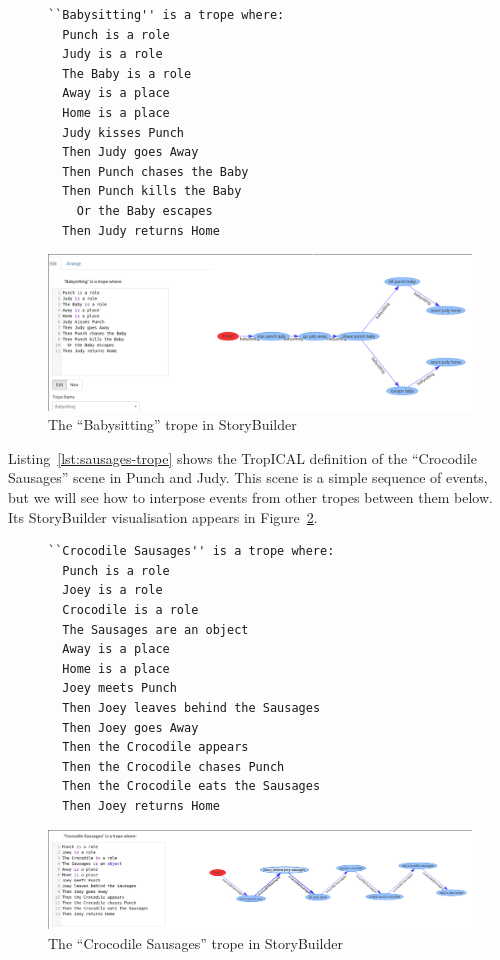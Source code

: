 \documentclass[11pt]{report}
\begin{document}
\begin{figure}[!t]
\begin{lstlisting}[label={lst:babysitting-trope},caption={The ``Babysitting'' trope}]
``Babysitting'' is a trope where:
  Punch is a role
  Judy is a role
  The Baby is a role
  Away is a place
  Home is a place
  Judy kisses Punch
  Then Judy goes Away
  Then Punch chases the Baby
  Then Punch kills the Baby
    Or the Baby escapes
  Then Judy returns Home
\end{lstlisting}

\smallskip
\centerline{\includegraphics[width=\textwidth]{babysitting-trope.png}}
\caption{The ``Babysitting'' trope in StoryBuilder}\label{fig:babysitting-trope}
\end{figure}

Listing~\ref{lst:sausages-trope} shows the TropICAL definition of the
``Crocodile Sausages'' scene in Punch and Judy. This scene is a simple sequence
of events, but we will see how to interpose events from other tropes between
them below. Its StoryBuilder visualisation appears in Figure~\ref{fig:crocodile-sausages}.

\begin{figure}[!t]
\begin{lstlisting}[label={lst:sausages-trope},caption={The ``Crocodile Sausages'' trope}]
``Crocodile Sausages'' is a trope where:
  Punch is a role
  Joey is a role
  Crocodile is a role
  The Sausages are an object
  Away is a place
  Home is a place
  Joey meets Punch
  Then Joey leaves behind the Sausages
  Then Joey goes Away
  Then the Crocodile appears
  Then the Crocodile chases Punch
  Then the Crocodile eats the Sausages
  Then Joey returns Home
\end{lstlisting}

\smallskip
\centerline{\includegraphics[width=\textwidth]{crocodile-trope.png}}
\caption{The ``Crocodile Sausages'' trope in StoryBuilder}\label{fig:crocodile-sausages}
\end{figure}
\end{document}
